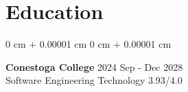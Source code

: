 \documentclass[10pt, letterpaper]{article}
\newenvironment{onecolentry}{
    \begin{adjustwidth}{
        0 cm + 0.00001 cm
    }{
        0 cm + 0.00001 cm
    }
}{
    \end{adjustwidth}
} %
\begin{document}
 \vspace{-8pt}
 \section{Education}
\vspace{-13pt}
\hrulefill
\vspace{+3pt}
\begin{onecolentry}
 {\normalsize \textbf{Conestoga College}} \hfill {2024 Sep - Dec 2028}\\
 \vspace{+3pt}
 {Software Engineering Technology} \hfill {3.93/4.0}\\
  \vspace{-8pt}
  
   
\end{onecolentry}
 
\end{document}

